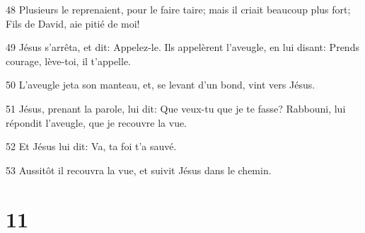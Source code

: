 \par 48 Plusieurs le reprenaient, pour le faire taire; mais il criait beaucoup plus fort; Fils de David, aie pitié de moi!
\par 49 Jésus s'arrêta, et dit: Appelez-le. Ils appelèrent l'aveugle, en lui disant: Prends courage, lève-toi, il t'appelle.
\par 50 L'aveugle jeta son manteau, et, se levant d'un bond, vint vers Jésus.
\par 51 Jésus, prenant la parole, lui dit: Que veux-tu que je te fasse? Rabbouni, lui répondit l'aveugle, que je recouvre la vue.
\par 52 Et Jésus lui dit: Va, ta foi t'a sauvé.
\par 53 Aussitôt il recouvra la vue, et suivit Jésus dans le chemin.

\chapter{11}

